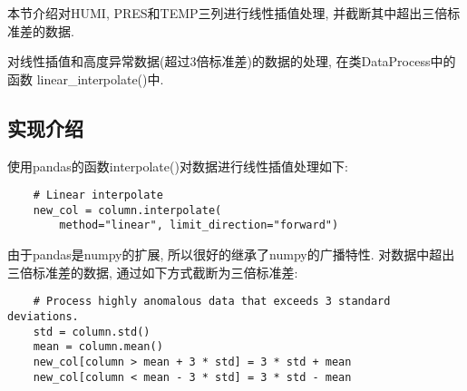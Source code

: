 本节介绍对HUMI, PRES和TEMP三列进行线性插值处理, 并截断其中超出三倍标准差的数据.\par

对线性插值和高度异常数据(超过3倍标准差)的数据的处理, 在类DataProcess中的函数
linear\_interpolate()中.\par

\subsection{实现介绍}
使用pandas的函数interpolate()对数据进行线性插值处理如下:
\begin{lstlisting}
    # Linear interpolate
    new_col = column.interpolate(
        method="linear", limit_direction="forward")
\end{lstlisting}

由于pandas是numpy的扩展, 所以很好的继承了numpy的广播特性. 对数据中超出三倍标准差的数据, 通过如下方式截断为三倍标准差:
\begin{lstlisting}
    # Process highly anomalous data that exceeds 3 standard deviations.
    std = column.std()
    mean = column.mean()
    new_col[column > mean + 3 * std] = 3 * std + mean
    new_col[column < mean - 3 * std] = 3 * std - mean
\end{lstlisting}

